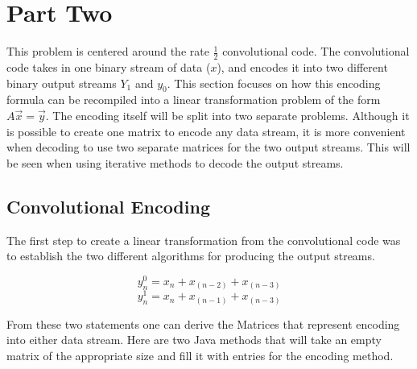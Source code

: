 \documentclass[letterpaper,12pt]{article}
\begin{document}
\newpage
\section{Part Two}


This problem is centered around the rate $\frac{1}{2}$ convolutional code.
The convolutional code takes in one binary stream of data ($x$), and encodes
it into two different binary output streams $Y_1$ and $y_0$.
This section focuses on how this encoding formula can be recompiled into a
linear transformation problem of the form $A\vec{x} = \vec{y}$.
The encoding itself will be split into two separate problems.
Although it is possible to create one matrix to encode any data stream, it
is more convenient when decoding to use two separate matrices for the two
output streams.
This will be seen when using iterative methods to decode the output streams.

\subsection{Convolutional Encoding}

The first step to create a linear transformation from the convolutional code
was to establish the two different algorithms for producing the output streams.

\[y_n^0 = x_n + x_{(n-2)} + x_{(n-3)}\]
\[y_n^1 = x_n + x_{(n-1)} + x_{(n-3)}\]

From these two statements one can derive the Matrices that represent encoding
into either data stream.
Here are two Java methods that will take an empty matrix of the appropriate
size and fill it with entries for the encoding method.
\end{document}
